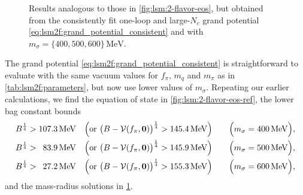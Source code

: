 \begin{figure}[p]
\caption{\label{fig:lsm:2-flavor-mass-radius-ref}%
Results analogous to those in \cref{fig:lsm:2-flavor-eos}, but obtained from the consistently fit one-loop and large-$N_c$ grand potential \eqref{eq:lsm2f:grand_potential_consistent}
and with $m_\sigma = \{400,500,600\} \, \si{\mega\electronvolt}$.
}
\end{figure}

The grand potential \eqref{eq:lsm2f:grand_potential_consistent} is straightforward to evaluate with the same vacuum values for $f_\pi$, $m_q$ and $m_\pi$ as in \cref{tab:lsm2f:parameters},
but now use lower values of $m_\sigma$.
Repeating our earlier calculations, we find the equation of state in \cref{fig:lsm:2-flavor-eos-ref},
the lower bag constant bounds
\begin{subequations}
\begin{align}
	B^\frac14 > \SI{107.3}{\mega\electronvolt}           \quad \Big(\text{or } \big(B-\mathcal{V}(f_\pi,{\bm{0}})\big)^\frac14 > \SI{145.4}{\mega\electronvolt}\Big) \qquad \Big(m_\sigma = \SI{400}{\mega\electronvolt}\Big), \\
	B^\frac14 > \phantom{0}\SI{83.9}{\mega\electronvolt} \quad \Big(\text{or } \big(B-\mathcal{V}(f_\pi,{\bm{0}})\big)^\frac14 > \SI{145.9}{\mega\electronvolt}\Big) \qquad \Big(m_\sigma = \SI{500}{\mega\electronvolt}\Big), \\
	B^\frac14 > \phantom{0}\SI{27.2}{\mega\electronvolt} \quad \Big(\text{or } \big(B-\mathcal{V}(f_\pi,{\bm{0}})\big)^\frac14 > \SI{155.3}{\mega\electronvolt}\Big) \qquad \Big(m_\sigma = \SI{600}{\mega\electronvolt}\Big),
\end{align}%
\label{eq:lsm:bag_lower_bound_ref}%
\end{subequations}%
and the mass-radius solutions in \cref{fig:lsm:2-flavor-mass-radius-ref}.

